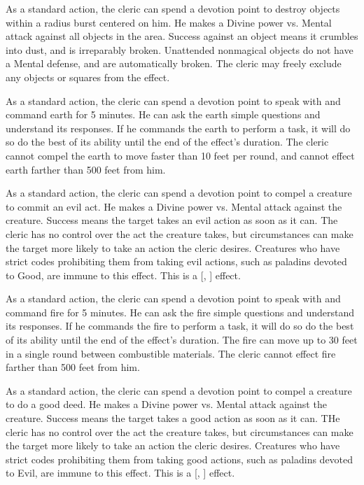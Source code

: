     As a standard action, the cleric can spend a devotion point to destroy objects within a \arealarge radius burst centered on him.
    He makes a Divine power vs. Mental attack against all objects in the area.
    Success against an object means it crumbles into dust, and is irreparably broken.
    Unattended nonmagical objects do not have a Mental defense, and are automatically broken.
    The cleric may freely exclude any objects or squares from the effect.

    As a standard action, the cleric can spend a devotion point to speak with and command earth for 5 minutes.
    He can ask the earth simple questions and understand its responses.
    If he commands the earth to perform a task, it will do so do the best of its ability until the end of the effect's duration.
    The cleric cannot compel the earth to move faster than 10 feet per round, and cannot effect earth farther than 500 feet from him.

    As a standard action, the cleric can spend a devotion point to compel a creature to commit an evil act.
    He makes a Divine power vs. Mental attack against the creature.
    Success means the target takes an evil action as soon as it can.
    The cleric has no control over the act the creature takes, but circumstances can make the target more likely to take an action the cleric desires.
    Creatures who have strict codes prohibiting them from taking evil actions, such as paladins devoted to Good, are immune to this effect.
    This is a [, ] effect.

    As a standard action, the cleric can spend a devotion point to speak with and command fire for 5 minutes.
    He can ask the fire simple questions and understand its responses.
    If he commands the fire to perform a task, it will do so do the best of its ability until the end of the effect's duration.
    The fire can move up to 30 feet in a single round between combustible materials.
    The cleric cannot effect fire farther than 500 feet from him.

    As a standard action, the cleric can spend a devotion point to compel a creature to do a good deed.
    He makes a Divine power vs. Mental attack against the creature.
    Success means the target takes a good action as soon as it can.
    THe cleric has no control over the act the creature takes, but circumstances can make the target more likely to take an action the cleric desires.
    Creatures who have strict codes prohibiting them from taking good actions, such as paladins devoted to Evil, are immune to this effect.
    This is a [, ] effect.

